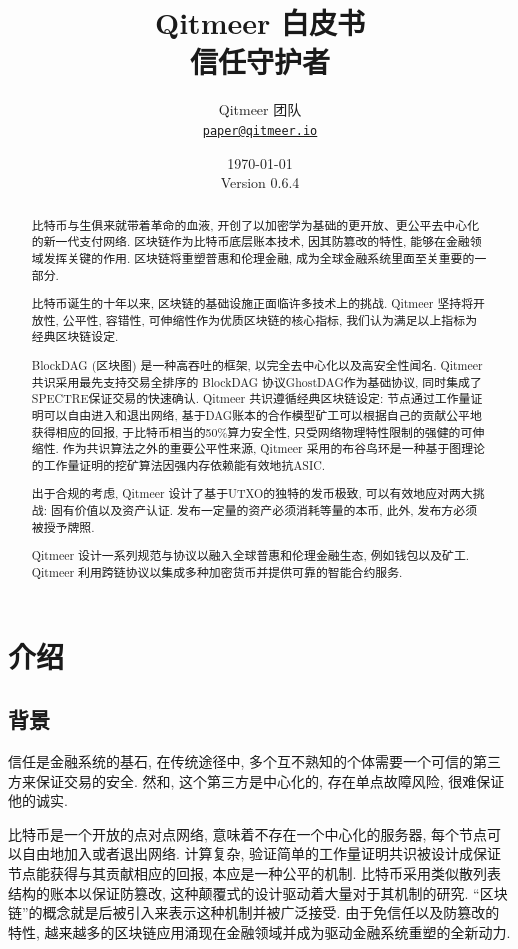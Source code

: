 \documentclass[a4paper,11pt]{article}
\title{\LARGE Qitmeer 白皮书\\
	\Large 信任守护者}
\author{
	Qitmeer 团队\\
		\small\href{mailto:paper@qitmeer.io}
			{\nolinkurl{paper@qitmeer.io}}
	}
\date{\today\\\small Version 0.6.4}
\newcommand{\watermark}[3]{\AddToShipoutPictureBG{
	\parbox[b][\paperheight]{\paperwidth}{
		\vfill%
		\centering%
	\tikz[remember picture, overlay]%
	  \node [rotate = #1, scale = #2] at (current page.center)%
	      {\textcolor{gray!80!cyan!30}{#3}};
	  \vfill}}}
\begin{document}
\clearpage
\pagestyle{plain}

\maketitle


\begin{abstract}
比特币\cite{bitcoin}与生俱来就带着革命的血液, 开创了以加密学为基础的更开放、更公平去中心化的新一代支付网络. 区块链作为比特币底层账本技术, 因其防篡改的特性, 能够在金融领域发挥关键的作用. 区块链将重塑普惠和伦理金融, 成为全球金融系统里面至关重要的一部分.

比特币诞生的十年以来, 区块链的基础设施正面临许多技术上的挑战. Qitmeer 坚持将开放性, 公平性, 容错性, 可伸缩性作为优质区块链的核心指标, 我们认为满足以上指标为经典区块链设定.

BlockDAG (区块图) 是一种高吞吐的框架, 以完全去中心化以及高安全性闻名. Qitmeer共识采用最先支持交易全排序的 BlockDAG 协议GhostDAG作为基础协议, 同时集成了SPECTRE保证交易的快速确认. Qitmeer 共识遵循经典区块链设定: 节点通过工作量证明可以自由进入和退出网络, 基于DAG账本的合作模型矿工可以根据自己的贡献公平地获得相应的回报, 于比特币相当的50\%算力安全性, 只受网络物理特性限制的强健的可伸缩性. 作为共识算法之外的重要公平性来源, Qitmeer 采用的布谷鸟环是一种基于图理论的工作量证明的挖矿算法因强内存依赖能有效地抗ASIC. 

出于合规的考虑, Qitmeer 设计了基于UTXO的独特的发币极致, 可以有效地应对两大挑战: 固有价值以及资产认证. 发布一定量的资产必须消耗等量的本币, 此外, 发布方必须被授予牌照.

Qitmeer 设计一系列规范与协议以融入全球普惠和伦理金融生态, 例如钱包以及矿工. Qitmeer 利用跨链协议以集成多种加密货币并提供可靠的智能合约服务.

\end{abstract}

\section{介绍}

\subsection{背景}

信任是金融系统的基石, 在传统途径中, 多个互不熟知的个体需要一个可信的第三方来保证交易的安全. 然和, 这个第三方是中心化的, 存在单点故障风险, 很难保证他的诚实.


比特币是一个开放的点对点网络, 意味着不存在一个中心化的服务器, 每个节点可以自由地加入或者退出网络. 计算复杂, 验证简单的工作量证明共识被设计成保证节点能获得与其贡献相应的回报, 本应是一种公平的机制. 比特币采用类似散列表结构的账本以保证防篡改, 这种颠覆式的设计驱动着大量对于其机制的研究. “区块链”的概念就是后被引入来表示这种机制并被广泛接受. 由于免信任以及防篡改的特性, 越来越多的区块链应用涌现在金融领域并成为驱动金融系统重塑的全新动力.
\end{document}
